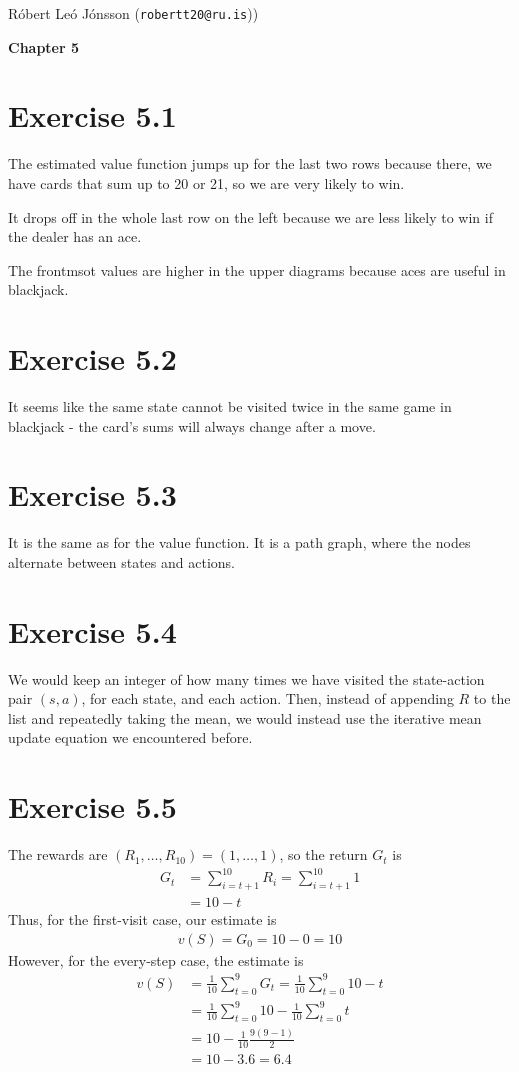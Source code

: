 \documentclass[a4paper,11pt,reqno]{amsart}
\newcommand{\rubrik}[1]{\bigskip \begin{center}{\bf #1}\end{center} \medskip}
\begin{document}
\pagestyle{empty}
\thispagestyle{empty}

{\small{\sc\noindent
        Róbert Leó Jónsson ({\tt robertt20@ru.is}))
}}

\rubrik{Chapter 5}

\section*{Exercise 5.1}
The estimated value function jumps up for the last two rows because there, we have cards that sum up to 20 or 21, so we are very likely to win. 

It drops off in the whole last row on the left because we are less likely to win if the dealer has an ace. 

The frontmsot values are higher in the upper diagrams because aces are useful in blackjack. 

\section*{Exercise 5.2}
It seems like the same state cannot be visited twice in the same game in blackjack - the card's sums will always change after a move. 


\section*{Exercise 5.3}
It is the same as for the value function. It is a path graph, where the nodes alternate between states and actions. 

\section*{Exercise 5.4}
We would keep an integer of how many times we have visited the state-action pair $(s, a)$, for each state, and each action. Then, instead of appending $R$ to the list and repeatedly taking the mean, we would instead use the iterative mean update equation we encountered before. 

\section*{Exercise 5.5}
The rewards are $(R_1, \ldots, R_{10}) = (1, \ldots, 1)$, so the return $G_t$ is
\begin{align}
    G_t &= \sum_{i=t+1}^{10} R_i = \sum_{i=t+1}^{10} 1 \\
        &= 10 - t 
\end{align}
Thus, for the first-visit case, our estimate is
\begin{align}
v(S) = G_0 = 10 - 0 = 10
\end{align}
However, for the every-step case, the estimate is
\begin{align}
    v(S) &= \frac{1}{10}\sum_{t=0}^{9} G_t = \frac{1}{10}\sum_{t=0}^{9} 10 - t \\
    &= \frac{1}{10}\sum_{t=0}^{9}10 - \frac{1}{10}\sum_{t=0}^{9} t  \\
    &= 10 - \frac{1}{10}\frac{9(9 - 1)}{2} \\
    &= 10 - 3.6 = 6.4 \\
\end{align}
\end{document}
